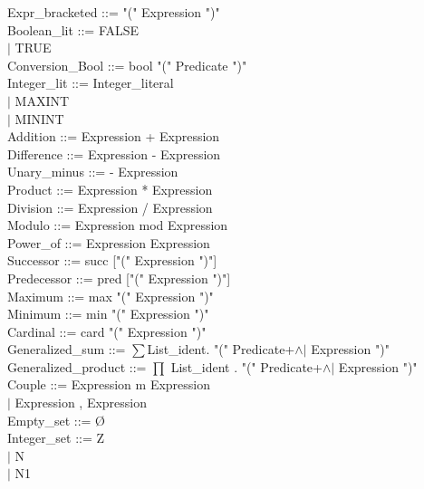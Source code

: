 \documentclass[12pt,a4paper,draft]{report}
\begin{document}
{\begin{sloppypar}
Expr\_bracketed  ::= "(" Expression ")" \\
Boolean\_lit   ::=  FALSE\\
   \hspace*{0.20in} $|$  TRUE\\
Conversion\_Bool  ::= bool   "(" Predicate ")" \\
Integer\_lit   ::= Integer\_literal \\
   \hspace*{0.20in} $|$  MAXINT\\
   \hspace*{0.20in} $|$  MININT\\
Addition   ::=  Expression + Expression \\
Difference   ::=  Expression - Expression \\
Unary\_minus  ::= - Expression \\
Product   ::=  Expression * Expression \\
Division   ::=  Expression / Expression \\
Modulo   ::=  Expression mod Expression \\
Power\_of   ::=  Expression Expression \\
Successor   ::=  succ ["(" Expression ")"] \\
Predecessor   ::=  pred ["(" Expression ")"] \\
Maximum   ::=  max "(" Expression ")" \\
Minimum   ::=  min "(" Expression ")" \\
Cardinal   ::= card "(" Expression ")" \\
Generalized\_sum  ::=  $ \sum $List\_ident. "(" Predicate+$\land$$|$ Expression ")" \\
Generalized\_product ::=  $\prod$ List\_ident . "(" Predicate+$\land$$|$ Expression ")" \\
Couple   ::=  Expression m Expression \\
\hspace*{0.20in}   $|$  Expression , Expression \\
Empty\_set   ::=  Ø\\
Integer\_set   ::=  Z\\
  \hspace*{0.20in} $|$  N\\
  \hspace*{0.20in} $|$  N1\\

\end{sloppypar}}
\end{document}
